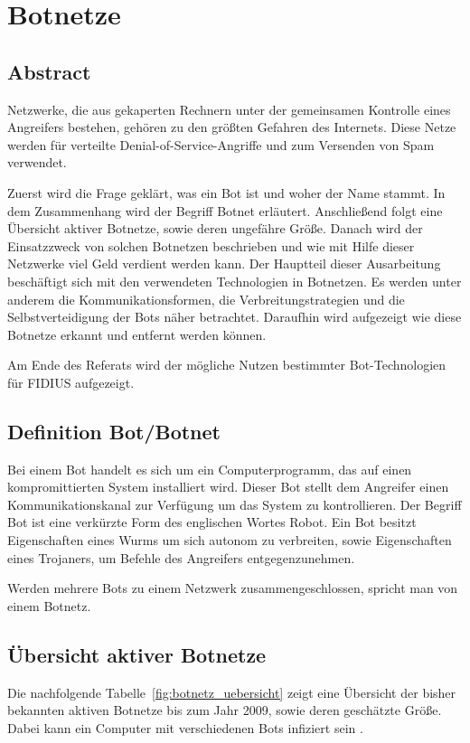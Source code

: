 \section{Botnetze}
\label{compositions:botnetze}

\subsection{Abstract}
Netzwerke, die aus gekaperten Rechnern unter der gemeinsamen Kontrolle eines 
Angreifers bestehen, gehören zu den größten Gefahren des Internets. Diese Netze 
werden für verteilte Denial-of-Service-Angriffe und zum Versenden von Spam 
verwendet.

Zuerst wird die Frage geklärt, was ein Bot ist und woher der Name stammt. In dem
Zusammenhang wird der Begriff Botnet erläutert. Anschließend folgt eine 
Übersicht aktiver Botnetze, sowie deren ungefähre Größe. Danach wird der 
Einsatzzweck von solchen Botnetzen beschrieben und wie mit Hilfe dieser 
Netzwerke viel Geld verdient werden kann. Der Hauptteil dieser Ausarbeitung 
beschäftigt sich mit den verwendeten Technologien in Botnetzen. Es werden unter 
anderem die Kommunikationsformen, die Verbreitungstrategien und die 
Selbstverteidigung der Bots näher betrachtet. Daraufhin wird aufgezeigt wie 
diese Botnetze erkannt und entfernt werden können. 

Am Ende des Referats wird der mögliche Nutzen bestimmter Bot-Technologien für 
FIDIUS aufgezeigt. 

\subsection{Definition Bot/Botnet}
Bei einem Bot handelt es sich um ein Computerprogramm, das auf einen
kompromittierten System installiert wird. Dieser Bot stellt dem Angreifer einen
Kommunikationskanal zur Verfügung um das System zu kontrollieren. Der Begriff Bot
ist eine verkürzte Form des englischen Wortes Robot. Ein Bot besitzt 
Eigenschaften eines Wurms um sich autonom zu verbreiten, sowie Eigenschaften 
eines Trojaners, um Befehle des Angreifers entgegenzunehmen. 

Werden mehrere Bots zu einem Netzwerk zusammengeschlossen, spricht man von einem
Botnetz.

\subsection{Übersicht aktiver Botnetze}
Die nachfolgende Tabelle~\ref{fig:botnetz_uebersicht} zeigt eine Übersicht der 
bisher bekannten aktiven  Botnetze bis zum Jahr 2009, sowie deren geschätzte 
Größe. Dabei kann ein Computer mit verschiedenen Bots infiziert sein \cite{de-wiki:botnetze}.

